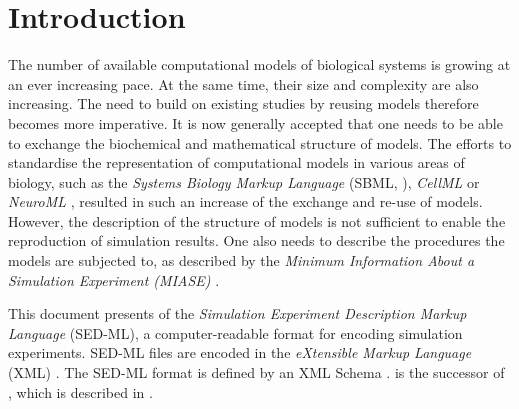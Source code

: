 \chapter{Introduction}

The number of available computational models of biological systems is growing at an ever increasing pace. 
At the same time, their size and complexity are also increasing. The need to build on existing studies by reusing models therefore becomes more imperative. 
It is now generally accepted that one needs to be able to exchange the biochemical and mathematical structure of models. 
The efforts to standardise the representation of computational models in various areas of biology, such as the \emph{Systems Biology Markup Language} (SBML, \citep{Hucka:2003}), \emph{CellML} \citep{cuellar:2003} or \emph{NeuroML} \citep{Goddard:2001}, resulted in such an increase of the exchange and re-use of models. 
However, the description of the structure of models is not sufficient to enable the reproduction of simulation results.  
One also needs to describe the procedures the models are subjected to, as described by the \emph{Minimum Information About a Simulation Experiment (MIASE)} \citep{Waltemath:2011}. 

This document presents  \LoneVtwo of the \emph{Simulation Experiment Description Markup Language} (SED-ML), a computer-readable format for encoding simulation experiments. 
SED-ML files are encoded in the \emph{eXtensible Markup Language} (XML) \citep{Bray:2006}. The SED-ML format is defined by an XML Schema \citep{Fallside:2001}. 
\LonVtwo is the successor of \LoneVone, which is described in \citep{WAB+11}.




